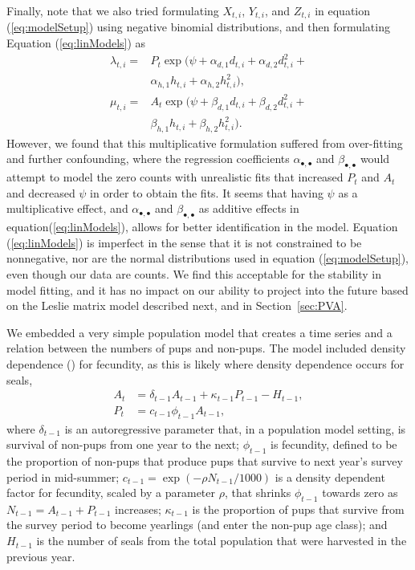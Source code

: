 \documentclass[]{risa}\usepackage[]{graphicx}\usepackage[]{color}
\begin{document}
Finally, note that we also tried formulating $X_{t,i}$, $Y_{t,i}$, and $Z_{t,i}$ in equation (\ref{eq:modelSetup}) using negative binomial distributions, and then formulating Equation (\ref{eq:linModels}) as
\begin{align*}
  \lambda_{t,i} = &P_t \exp(\psi + \alpha_{d,1}d_{t,i} + \alpha_{d,2}d^2_{t,i} + \\
	  &\alpha_{h,1}h_{t,i} + \alpha_{h,2}h^2_{t,i}), \nonumber \\
  \mu_{t,i} = &A_t \exp(\psi + \beta_{d,1}d_{t,i} + \beta_{d,2}d^2_{t,i} + \\ 
	  &\beta_{h,1}h_{t,i} + \beta_{h,2}h^2_{t,i}). 
\end{align*}
However, we found that this multiplicative formulation suffered from over-fitting and further confounding, where the regression coefficients $\alpha_{\bullet,\bullet}$ and $\beta_{\bullet,\bullet}$ would attempt to model the zero counts with unrealistic fits that increased $P_t$ and $A_t$ and decreased $\psi$ in order to obtain the fits.  It seems that having $\psi$ as a multiplicative effect, and $\alpha_{\bullet,\bullet}$ and $\beta_{\bullet,\bullet}$ as additive effects in equation(\ref{eq:linModels}), allows for better identification in the model. Equation (\ref{eq:linModels}) is imperfect in the sense that it is not constrained to be nonnegative, nor are the normal distributions used in equation (\ref{eq:modelSetup}), even though our data are counts. We find this acceptable for the stability in model fitting, and it has no impact on our ability to project into the future based on the Leslie matrix model described next, and in Section~\ref{sec:PVA}.  

We embedded a very simple population model that creates a time series and a relation between the numbers of pups and non-pups.  The model included density dependence (\citet[][p. 511]{Casw:matr:2001}) for fecundity, as this is likely where density dependence occurs for seals, 
%
\begin{align}\label{eq:popmod}
    A_t &= \delta_{t-1}A_{t-1} + \kappa_{t-1} P_{t-1} - H_{t-1},  \nonumber \\
		P_t &= c_{t-1}\phi_{t-1}A_{t-1},
\end{align}
%
where $\delta_{t-1}$ is an autoregressive parameter that, in a population model setting, is survival of non-pups from one year to the next; $\phi_{t-1}$ is fecundity, defined to be the proportion of non-pups that produce pups that survive to next year's survey period in mid-summer; $c_{t-1} = \exp(-\rho N_{t-1}/1000)$ is a density dependent factor for fecundity, scaled by a parameter $\rho$, that shrinks $\phi_{t-1}$ towards zero as $N_{t-1} = A_{t-1} + P_{t-1}$ increases;  $\kappa_{t-1}$ is the proportion of pups that survive from the survey period to become yearlings (and enter the non-pup age class); and $H_{t-1}$ is the number of seals from the total population that were harvested in the previous year.
\end{document}
